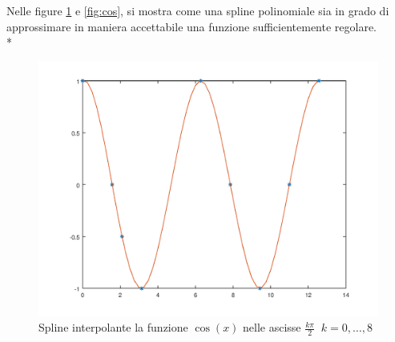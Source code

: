 Nelle figure \ref{fig:spline} e \ref{fig:cos}, si mostra come una spline polinomiale sia in grado di approssimare in maniera accettabile una funzione sufficientemente regolare.\\*
\begin{figure}[h]
	\centering
	\includegraphics[width=\linewidth]{img/spline}
	\caption{Spline interpolante la funzione $\cos(x)$ nelle ascisse $ \frac{k\pi}{2}\;\; k = 0,\dots,8$}
	\label{fig:spline}
\end{figure}

